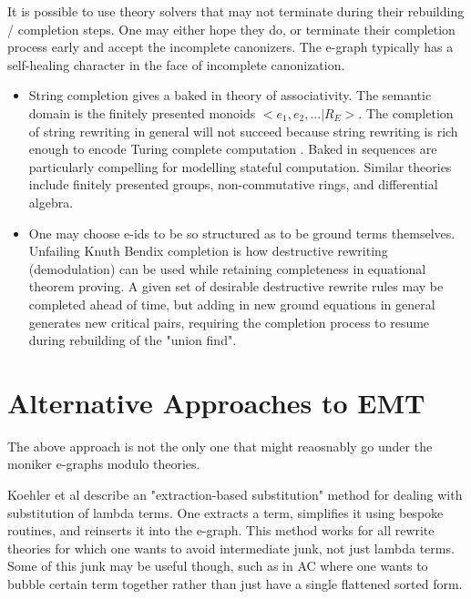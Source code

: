 \documentclass[sigconf]{acmart}
\begin{document}
It is possible to use theory solvers that may not terminate during their rebuilding / completion steps. One may either hope they do, or terminate their completion process early and accept the incomplete canonizers. The e-graph typically has a self-healing character in the face of incomplete canonization.

\begin{itemize}
\item String completion gives a baked in theory of associativity. The semantic domain is the finitely presented monoids $<e_1, e_2, ... | R_E>$. The completion of string rewriting in general will not succeed because string rewriting is rich enough to encode Turing complete computation \cite{traatbook}. Baked in sequences are particularly compelling for modelling stateful computation. Similar theories include finitely presented groups, non-commutative rings, and differential algebra.

\item One may choose e-ids to be so structured as to be ground terms themselves. Unfailing Knuth Bendix completion is how destructive rewriting (demodulation) can be used while retaining completeness in equational theorem proving. A given set of desirable destructive rewrite rules may be completed ahead of time, but adding in new ground equations in general generates new critical pairs, requiring the completion process to resume during rebuilding of the "union find".

\end{itemize}





\section{Alternative Approaches to EMT}

The above approach is not the only one that might reaosnably go under the moniker e-graphs modulo theories.

Koehler et al describe an "extraction-based substitution" \cite{koehler2022sketchguidedequalitysaturationscaling} method for dealing with substitution of lambda terms. One extracts a term, simplifies it using bespoke routines, and reinserts it into the e-graph. This method works for all rewrite theories for which one wants to avoid intermediate junk, not just lambda terms. Some of this junk may be useful though, such as in AC where one wants to bubble certain term together rather than just have a single flattened sorted form.
\end{document}
